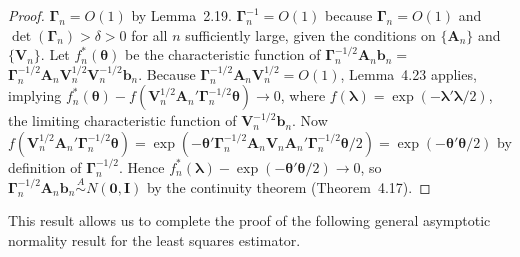 \begin{proof}
$\boldsymbol{\Gamma}_n = O(1)$ by Lemma~2.19. $\boldsymbol{\Gamma}_n^{-1} = O(1)$ because $\boldsymbol{\Gamma}_n = O(1)$
and $\det(\boldsymbol{\Gamma}_n) > \delta > 0$ for all $n$ sufficiently large, given the conditions on
$\{\mathbf{A}_n\}$ and $\{\mathbf{V}_n\}$. Let $f_n^*(\boldsymbol{\theta})$ be the characteristic function of $\boldsymbol{\Gamma}_n^{-1/2}\mathbf{A}_n\mathbf{b}_n =$
$\boldsymbol{\Gamma}_n^{-1/2}\mathbf{A}_n\mathbf{V}_n^{1/2}\mathbf{V}_n^{-1/2}\mathbf{b}_n$. Because $\boldsymbol{\Gamma}_n^{-1/2}\mathbf{A}_n\mathbf{V}_n^{1/2} = O(1)$, Lemma~4.23 applies, implying $f_n^*(\boldsymbol{\theta}) - f(\mathbf{V}_n^{1/2}\mathbf{A}_n'\boldsymbol{\Gamma}_n^{-1/2}\boldsymbol{\theta}) \to 0$, where $f(\boldsymbol{\lambda}) = \exp(-\boldsymbol{\lambda}'\boldsymbol{\lambda}/2)$,
the limiting characteristic function of $\mathbf{V}_n^{-1/2}\mathbf{b}_n$. Now $f(\mathbf{V}_n^{1/2}\mathbf{A}_n'\boldsymbol{\Gamma}_n^{-1/2}\boldsymbol{\theta}) =
\exp(-\boldsymbol{\theta}'\boldsymbol{\Gamma}_n^{-1/2}\mathbf{A}_n\mathbf{V}_n\mathbf{A}_n'\boldsymbol{\Gamma}_n^{-1/2}\boldsymbol{\theta}/2) = \exp(-\boldsymbol{\theta}'\boldsymbol{\theta}/2)$ by definition of $\boldsymbol{\Gamma}_n^{-1/2}$.
Hence $f_n^*(\boldsymbol{\lambda}) - \exp(-\boldsymbol{\theta}'\boldsymbol{\theta}/2) \to 0$, so $\boldsymbol{\Gamma}_n^{-1/2}\mathbf{A}_n\mathbf{b}_n \overset{A}{\sim} N(\mathbf{0}, \mathbf{I})$ by the continuity theorem (Theorem~4.17).
\end{proof}

This result allows us to complete the proof of the following general
asymptotic normality result for the least squares estimator.

